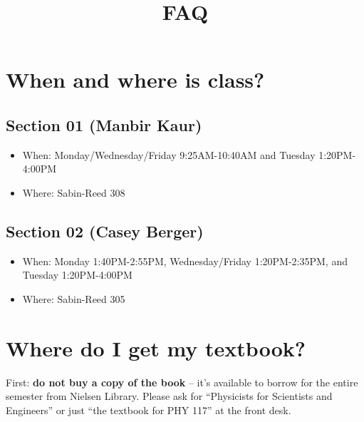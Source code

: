 \documentclass[
  letterpaper,
  DIV=11,
  numbers=noendperiod]{scrartcl}
\title{FAQ}
\author{}
\date{}
\providecommand{\tightlist}{%
  \setlength{\itemsep}{0pt}\setlength{\parskip}{0pt}}\usepackage{longtable,booktabs,array}
\renewcommand*\contentsname{Table of contents}
\newcommand\contentsname{Table of contents}
\begin{document}
\maketitle
\ifdefined\Shaded\renewenvironment{Shaded}{\begin{tcolorbox}[sharp corners, interior hidden, boxrule=0pt, borderline west={3pt}{0pt}{shadecolor}, frame hidden, enhanced, breakable]}{\end{tcolorbox}}\fi

\renewcommand*\contentsname{Table of contents}
{
\hypersetup{linkcolor=}
\setcounter{tocdepth}{3}
\tableofcontents
}
\hypertarget{when-and-where-is-class}{%
\section{When and where is class?}\label{when-and-where-is-class}}

\subsection{Section 01 (Manbir Kaur)}

\begin{itemize}
\tightlist
\item
  When: Monday/Wednesday/Friday 9:25AM-10:40AM and Tuesday 1:20PM-4:00PM
\item
  Where: Sabin-Reed 308
\end{itemize}

\subsection{Section 02 (Casey Berger)}

\begin{itemize}
\tightlist
\item
  When: Monday 1:40PM-2:55PM, Wednesday/Friday 1:20PM-2:35PM, and
  Tuesday 1:20PM-4:00PM
\item
  Where: Sabin-Reed 305
\end{itemize}

\hypertarget{where-do-i-get-my-textbook}{%
\section{Where do I get my textbook?}\label{where-do-i-get-my-textbook}}

First: \textbf{do not buy a copy of the book} -- it's available to
borrow for the entire semester from Nielsen Library. Please ask for
``Physicists for Scientists and Engineers'' or just ``the textbook for
PHY 117'' at the front desk.
\end{document}
